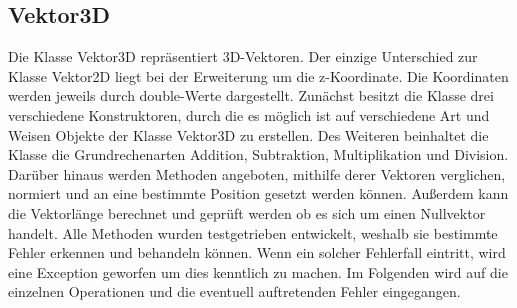 \documentclass[a4paper,11pt]{scrartcl}
\begin{document}
\subsection{Vektor3D}
Die Klasse Vektor3D repräsentiert 3D-Vektoren. Der einzige Unterschied zur Klasse Vektor2D liegt bei der Erweiterung um die z-Koordinate. Die Koordinaten werden jeweils durch double-Werte dargestellt. Zunächst besitzt die Klasse drei verschiedene Konstruktoren, durch die es möglich ist auf verschiedene Art und Weisen Objekte der Klasse Vektor3D zu erstellen. Des Weiteren beinhaltet die Klasse die Grundrechenarten Addition, Subtraktion, Multiplikation und Division. Darüber hinaus werden Methoden angeboten, mithilfe derer Vektoren verglichen, normiert und an eine bestimmte Position gesetzt werden können. Außerdem kann die Vektorlänge berechnet und geprüft werden ob es sich um einen Nullvektor handelt. Alle Methoden wurden testgetrieben entwickelt, weshalb sie bestimmte Fehler erkennen und behandeln können. Wenn ein solcher Fehlerfall eintritt, wird eine Exception geworfen um dies kenntlich zu machen. Im Folgenden wird auf die einzelnen Operationen und die eventuell auftretenden Fehler eingegangen.
\end{document}
